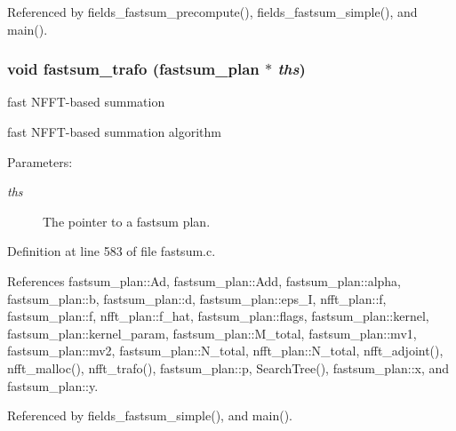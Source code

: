 Referenced by fields\_\-fastsum\_\-precompute(), fields\_\-fastsum\_\-simple(), and main().\hypertarget{group__applications__fastsum_gab2cc691ba59064c18d439c9fd2185e8}{
\subsubsection{\setlength{\rightskip}{0pt plus 5cm}void fastsum\_\-trafo ({\bf fastsum\_\-plan} $\ast$ {\em ths})}}
\label{group__applications__fastsum_gab2cc691ba59064c18d439c9fd2185e8}


fast NFFT-based summation 

fast NFFT-based summation algorithm

\begin{Desc}
\item[Parameters:]
\begin{description}
\item[{\em ths}]The pointer to a fastsum plan. \end{description}
\end{Desc}


Definition at line 583 of file fastsum.c.

References fastsum\_\-plan::Ad, fastsum\_\-plan::Add, fastsum\_\-plan::alpha, fastsum\_\-plan::b, fastsum\_\-plan::d, fastsum\_\-plan::eps\_\-I, nfft\_\-plan::f, fastsum\_\-plan::f, nfft\_\-plan::f\_\-hat, fastsum\_\-plan::flags, fastsum\_\-plan::kernel, fastsum\_\-plan::kernel\_\-param, fastsum\_\-plan::M\_\-total, fastsum\_\-plan::mv1, fastsum\_\-plan::mv2, fastsum\_\-plan::N\_\-total, nfft\_\-plan::N\_\-total, nfft\_\-adjoint(), nfft\_\-malloc(), nfft\_\-trafo(), fastsum\_\-plan::p, SearchTree(), fastsum\_\-plan::x, and fastsum\_\-plan::y.

Referenced by fields\_\-fastsum\_\-simple(), and main().